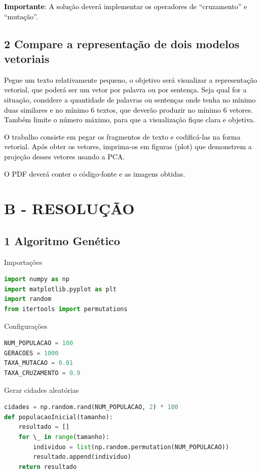 \textbf{\textcolor{black}{Importante}}\textcolor{black}{: A solução deverá implementar os operadores de “cruzamento” e
“mutação”.}


\subsection*{\textbf{2 Compare a representação de dois modelos vetoriais}}


\textcolor{black}{Pegue um texto relativamente pequeno, o objetivo será visualizar a representação vetorial, que poderá
ser um vetor por palavra ou por sentença. Seja qual for a situação, considere a quantidade de palavras ou sentenças
onde tenha no mínimo duas similares e no mínimo 6 textos, que deverão produzir no mínimo 6 vetores. Também limite o
número máximo, para que a visualização fique clara e objetiva.}


\textcolor{black}{O trabalho consiste em pegar os fragmentos de texto e codificá-las na forma vetorial. Após obter os
vetores, imprima-os em figuras (plot) que demonstrem a projeção desses vetores usando a PCA.}


\textcolor{black}{O PDF deverá conter o código-fonte e as imagens obtidas.}


\section*{\textbf{B - RESOLUÇÃO}}


\subsection*{\textbf{1 Algoritmo Genético}}

Importações

\begin{lstlisting}[language=Python, style=input]
import numpy as np
import matplotlib.pyplot as plt
import random
from itertools import permutations
\end{lstlisting}

Configurações

\begin{lstlisting}[language=Python, style=input]
NUM_POPULACAO = 100
GERACOES = 1000
TAXA_MUTACAO = 0.01
TAXA_CRUZAMENTO = 0.9
\end{lstlisting}

Gerar cidades aleatórias

\begin{lstlisting}[language=Python, style=input]
cidades = np.random.rand(NUM_POPULACAO, 2) * 100
def populacaoInicial(tamanho): 
    resultado = [] 
    for \_ in range(tamanho): 
        individuo = list(np.random.permutation(NUM_POPULACAO)) 
        resultado.append(individuo) 
    return resultado
\end{lstlisting}

